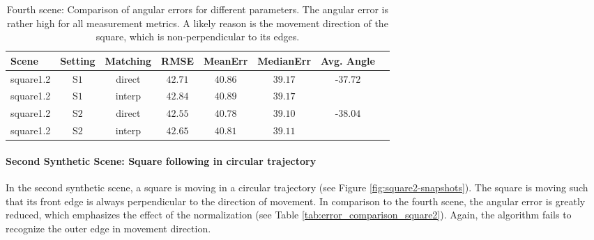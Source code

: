 \begin{table}[tb]
	\centering
		\begin{tabular}{lccccccc}
Scene & Setting & Matching & RMSE & MeanErr & MedianErr & Avg. Angle \\
\hline  \hline
square1.2 & S$1$ & direct & $42.71$ & $40.86$ & $39.17$ & -$37.72$ & \\
square1.2 & S$1$ & interp & $42.84$ & $40.89$ & $39.17$ &  & \\
square1.2 & S$2$ & direct & $42.55$ & $40.78$ & $39.10$ & -$38.04$ & \\
square1.2 & S$2$ & interp & $42.65$ & $40.81$ & $39.11$ &  & \\
		\end{tabular}
	\caption[Fourth scene: Comparison of angular errors for different parameters.]{Fourth scene: Comparison of angular errors for different parameters.
	The angular error is rather high for all measurement metrics.
	A likely reason is the movement direction of the square, which is non-perpendicular to its edges.}
	\label{tab:error_comparison_square12}
\end{table}

\paragraph{Second Synthetic Scene: Square following in circular trajectory}

In the second synthetic scene, a square is moving in a circular trajectory (see Figure \ref{fig:square2-snapshots}).
The square is moving such that its front edge is always perpendicular to the direction of movement.
In comparison to the fourth scene, the angular error is greatly reduced, which emphasizes the effect of the normalization (see Table \ref{tab:error_comparison_square2}).
Again, the algorithm fails to recognize the outer edge in movement direction.

